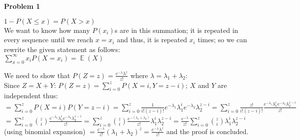 \documentclass{article}
\DeclareMathOperator{\EX}{\mathbb{E}}%
\newenvironment{problem}[2][Problem]
    { \begin{mdframed}[backgroundcolor=gray!20] \textbf{#1 #2} \\}
    {  \end{mdframed}}
\begin{document}
    \begin{problem}{1}
    	\begin{section}{}
    		\noindent
    		$1 - P(X\leq x) = P(X>x)$ \\
    		We want to know how many $P(x_i)$s are in this summation; it is repeated in every 
    		sequence until we reach $x=x_i$ and thus, it is repeated $x_i$ times; so we can 
    		rewrite the given statement as follows:\\
    		$\displaystyle\sum_{x=0}^\infty x_iP(X=x_i) = \EX(X)$
    	\end{section}
    	
    	\begin{section}{}
    		\noindent
    		We need to show that $P(Z=z)=\frac{e^{-\lambda}\lambda^z}{z!}$ where 
    		$\lambda = \lambda_1+\lambda_2$:\\
    		Since $\displaystyle Z=X+Y$: $P(Z=z) = \displaystyle\sum_{i=0}^{z}P(X=i,Y=z-i)$; $X$ and $Y$ are independent 
    		thus:\\ 
    		$=\displaystyle\sum_{i=0}^{z}P(X=i)P(Y=z-i) = \sum_{i=0}^z\frac{1}{i!(z-i)!}e^{-						\lambda_1}\lambda_1^ie^{-\lambda_2}\lambda_2^{z-i} = \sum_{i=0}^z\frac{z!}{i!(z-i)!}					\frac{e^{-\lambda_1}\lambda_1^ie^{-\lambda_2}\lambda_2^{z-i}}{z!}$ \\
    		$= \displaystyle\sum_{i=0}^{z}\displaystyle\binom{z}{i}\frac{e^{-\lambda_1}								\lambda_1^ie^{-\lambda_2}\lambda_2^{z-i}}				{z!} = \displaystyle\sum_{i=0}					^{z}\displaystyle\binom{z}{i}\frac{e^{-(\lambda_1+						\lambda_2)}}{z!}				\lambda_1^i\lambda_2^{z-i} = \frac{e^{-\lambda}}{z!}\displaystyle\sum_{i=0}^{z}							\displaystyle\binom{z}{i}\lambda_1^i\lambda_2^{z-i}$\\
    		(using binomial expansion) $=  \displaystyle\frac{e^{-\lambda}}{z!}(\lambda_1+							\lambda_2)^z = 
    		\frac{e^{-\lambda}\lambda^z}{z!}$ and the proof is concluded.
    		
    	\end{section}
    \end{problem}
    
\end{document}
